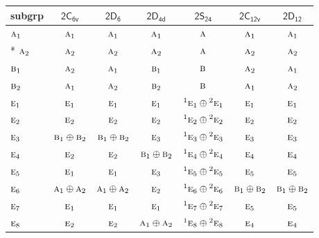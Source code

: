 \documentclass[10pt,a4paper]{article}
\numberwithin{equation}{section}
\newcommand{\grp}[1]{\mathsf{#1}}
\newcommand{\irr}[1]{\text{\normalfont\scshape #1}}
\newcommand{\conjpair}[1]{{}^{#1}}
\begin{document}
{\small\begin{longtable}{@{}lcccccc@{}}\toprule
subgrp & \href{2C6v.pdf}{$\grp{2C_{6v}}$} & \href{2D6.pdf}{$\grp{2D_{6}}$} & \href{2D4d.pdf}{$\grp{2D_{4d}}$} & \href{2S24.pdf}{$\grp{2S_{24}}$} & \href{2C12v.pdf}{$\grp{2C_{12v}}$} & \href{2D12.pdf}{$\grp{2D_{12}}$}\\\midrule\endhead
\bottomrule\endfoot\endlastfoot
$\irr{a}_{1}$ & $\irr{a}_{1}$ & $\irr{a}_{1}$ & $\irr{a}_{1}$ & $\irr{a}$ & $\irr{a}_{1}$ & $\irr{a}_{1}$\\*
$\irr{a}_{2}$ & $\irr{a}_{2}$ & $\irr{a}_{2}$ & $\irr{a}_{2}$ & $\irr{a}$ & $\irr{a}_{2}$ & $\irr{a}_{2}$\\
$\irr{b}_{1}$ & $\irr{a}_{2}$ & $\irr{a}_{1}$ & $\irr{b}_{1}$ & $\irr{b}$ & $\irr{a}_{2}$ & $\irr{a}_{1}$\\
$\irr{b}_{2}$ & $\irr{a}_{1}$ & $\irr{a}_{2}$ & $\irr{b}_{2}$ & $\irr{b}$ & $\irr{a}_{1}$ & $\irr{a}_{2}$\\
$\irr{e}_{1}$ & $\irr{e}_{1}$ & $\irr{e}_{1}$ & $\irr{e}_{1}$ & $\conjpair{1}\irr{e}_{1}\oplus \conjpair{2}\irr{e}_{1}$ & $\irr{e}_{1}$ & $\irr{e}_{1}$\\
$\irr{e}_{2}$ & $\irr{e}_{2}$ & $\irr{e}_{2}$ & $\irr{e}_{2}$ & $\conjpair{1}\irr{e}_{2}\oplus \conjpair{2}\irr{e}_{2}$ & $\irr{e}_{2}$ & $\irr{e}_{2}$\\
$\irr{e}_{3}$ & $\irr{b}_{1}\oplus \irr{b}_{2}$ & $\irr{b}_{1}\oplus \irr{b}_{2}$ & $\irr{e}_{3}$ & $\conjpair{1}\irr{e}_{3}\oplus \conjpair{2}\irr{e}_{3}$ & $\irr{e}_{3}$ & $\irr{e}_{3}$\\
$\irr{e}_{4}$ & $\irr{e}_{2}$ & $\irr{e}_{2}$ & $\irr{b}_{1}\oplus \irr{b}_{2}$ & $\conjpair{1}\irr{e}_{4}\oplus \conjpair{2}\irr{e}_{4}$ & $\irr{e}_{4}$ & $\irr{e}_{4}$\\
$\irr{e}_{5}$ & $\irr{e}_{1}$ & $\irr{e}_{1}$ & $\irr{e}_{3}$ & $\conjpair{1}\irr{e}_{5}\oplus \conjpair{2}\irr{e}_{5}$ & $\irr{e}_{5}$ & $\irr{e}_{5}$\\
$\irr{e}_{6}$ & $\irr{a}_{1}\oplus \irr{a}_{2}$ & $\irr{a}_{1}\oplus \irr{a}_{2}$ & $\irr{e}_{2}$ & $\conjpair{1}\irr{e}_{6}\oplus \conjpair{2}\irr{e}_{6}$ & $\irr{b}_{1}\oplus \irr{b}_{2}$ & $\irr{b}_{1}\oplus \irr{b}_{2}$\\
$\irr{e}_{7}$ & $\irr{e}_{1}$ & $\irr{e}_{1}$ & $\irr{e}_{1}$ & $\conjpair{1}\irr{e}_{7}\oplus \conjpair{2}\irr{e}_{7}$ & $\irr{e}_{5}$ & $\irr{e}_{5}$\\
$\irr{e}_{8}$ & $\irr{e}_{2}$ & $\irr{e}_{2}$ & $\irr{a}_{1}\oplus \irr{a}_{2}$ & $\conjpair{1}\irr{e}_{8}\oplus \conjpair{2}\irr{e}_{8}$ & $\irr{e}_{4}$ & $\irr{e}_{4}$\\

\end{longtable}}
\end{document}
